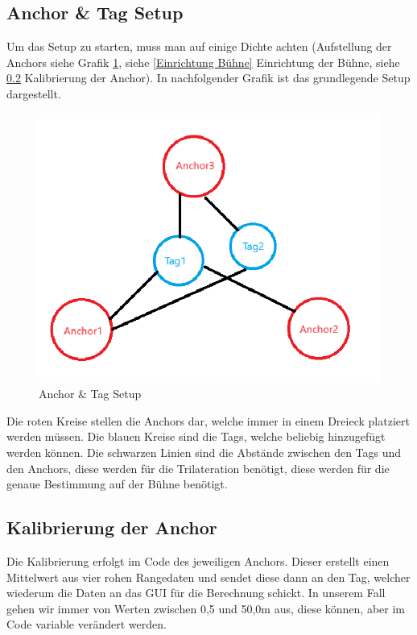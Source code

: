 \subsection{Anchor \& Tag Setup}
Um das Setup zu starten, muss man auf einige Dichte achten (Aufstellung der Anchors siehe Grafik \ref{fig:AnchorTagSetup}, siehe \ref{Einrichtung Bühne} Einrichtung der Bühne, siehe \ref{KalibrierungDerAnchor} Kalibrierung der Anchor). In nachfolgender Grafik ist das grundlegende Setup dargestellt.

\begin{figure}[H]
	\centering
	\includegraphics[width=0.5\linewidth]{images/AnchorTagSetup.png}
	\caption[AnchorTagSetup]{Anchor \& Tag Setup}
	\label{fig:AnchorTagSetup}
\end{figure}

Die roten Kreise stellen die Anchors dar, welche immer in einem Dreieck platziert werden müssen. Die blauen Kreise sind die Tags, welche beliebig hinzugefügt werden können. Die schwarzen Linien sind die Abstände zwischen den Tags und den Anchors, diese werden für die Trilateration benötigt, diese werden für die genaue Bestimmung auf der Bühne benötigt. 

\subsection{Kalibrierung der Anchor}
\label{KalibrierungDerAnchor}
Die Kalibrierung erfolgt im Code des jeweiligen Anchors. Dieser erstellt einen Mittelwert aus vier rohen Rangedaten und sendet diese dann an den Tag, welcher wiederum die Daten an das GUI für die Berechnung schickt. In unserem Fall gehen wir immer von Werten zwischen 0,5 und 50,0m aus, diese können, aber im Code variable verändert werden.

